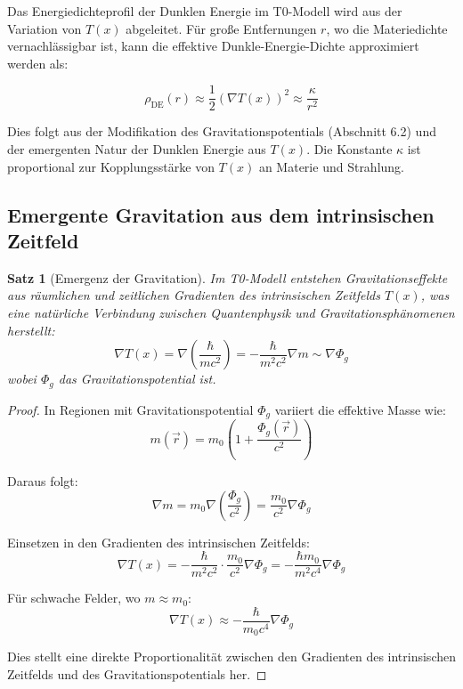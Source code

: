 \documentclass[a4paper,12pt]{article}
\newtheorem{theorem}{Satz}[section]
\theoremstyle{definition}
\theoremstyle{remark}
\newcommand{\Tfield}{T(x)} %
\begin{document}
	Das Energiedichteprofil der Dunklen Energie im T0-Modell wird aus der Variation von \(\Tfield\) abgeleitet. Für große Entfernungen \(r\), wo die Materiedichte vernachlässigbar ist, kann die effektive Dunkle-Energie-Dichte approximiert werden als:
	
	\begin{equation}
		\rho_{\text{DE}}(r) \approx \frac{1}{2} \left(\nabla \Tfield\right)^2 \approx \frac{\kappa}{r^2}
	\end{equation}
	
	Dies folgt aus der Modifikation des Gravitationspotentials (Abschnitt 6.2) und der emergenten Natur der Dunklen Energie aus \(\Tfield\). Die Konstante \(\kappa\) ist proportional zur Kopplungsstärke von \(\Tfield\) an Materie und Strahlung.
	
	\subsection{Emergente Gravitation aus dem intrinsischen Zeitfeld}
	
	\begin{theorem}[Emergenz der Gravitation]
		Im T0-Modell entstehen Gravitationseffekte aus räumlichen und zeitlichen Gradienten des intrinsischen Zeitfelds \(\Tfield\), was eine natürliche Verbindung zwischen Quantenphysik und Gravitationsphänomenen herstellt:
		\begin{equation}
			\nabla \Tfield = \nabla \left(\frac{\hbar}{mc^2}\right) = -\frac{\hbar}{m^2c^2}\nabla m \sim \nabla \Phi_g
		\end{equation}
		wobei \(\Phi_g\) das Gravitationspotential ist.
	\end{theorem}
	
	\begin{proof}
		In Regionen mit Gravitationspotential \(\Phi_g\) variiert die effektive Masse wie:
		\begin{equation}
			m(\vec{r}) = m_0\left(1 + \frac{\Phi_g(\vec{r})}{c^2}\right)
		\end{equation}
		
		Daraus folgt:
		\begin{equation}
			\nabla m = m_0 \nabla\left(\frac{\Phi_g}{c^2}\right) = \frac{m_0}{c^2}\nabla\Phi_g
		\end{equation}
		
		Einsetzen in den Gradienten des intrinsischen Zeitfelds:
		\begin{equation}
			\nabla \Tfield = -\frac{\hbar}{m^2c^2}\cdot\frac{m_0}{c^2}\nabla\Phi_g = -\frac{\hbar m_0}{m^2c^4}\nabla\Phi_g
		\end{equation}
		
		Für schwache Felder, wo \(m \approx m_0\):
		\begin{equation}
			\nabla \Tfield \approx -\frac{\hbar}{m_0c^4}\nabla\Phi_g
		\end{equation}
		
		Dies stellt eine direkte Proportionalität zwischen den Gradienten des intrinsischen Zeitfelds und des Gravitationspotentials her.
	\end{proof}
	
\end{document}
